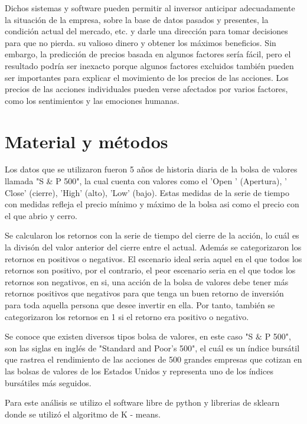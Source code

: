 \documentclass[a4paper]{article}
\begin{document}
Dichos sistemas y software pueden permitir al inversor anticipar adecuadamente la situación de la empresa, sobre la base de datos pasados y presentes, la condición actual del mercado, etc. y darle una dirección para tomar decisiones para que no pierda. su valioso dinero y obtener los máximos beneficios. Sin embargo, la predicción de precios basada en algunos factores sería fácil, pero el resultado podría ser inexacto porque algunos factores excluidos también pueden ser importantes para explicar el movimiento de los precios de las acciones. Los precios de las acciones individuales pueden verse afectados por varios factores, como los sentimientos y las emociones humanas. 

\section{Material y m\'etodos}
Los datos que se utilizaron fueron 5 a\~{n}os de historia diaria de la bolsa de valores llamada "S \& P 500", la cual cuenta con valores como el 'Open '  (Apertura), ' Close' (cierre), 'High' (alto), 'Low' (bajo). Estas medidas de la serie de tiempo con medidas  refleja el precio m\'inimo y m\'aximo de la bolsa asi como el precio con el que abrio y cerro. 

Se calcularon los retornos con la serie de tiempo del cierre de la acción, lo cu\'al es la divisón del valor anterior del cierre entre el actual. Además se categorizaron los retornos en positivos o negativos. El escenario ideal seria aquel en el que todos los retornos son positivo, por el contrario, el peor escenario seria en el que todos los retornos son negativos, en si, una acción de la bolsa de valores debe tener más retornos positivos que negativos para que tenga un buen retorno de inversión para toda aquella persona que desee invertir en ella. Por tanto, también se categorizaron los retornos en 1 si el retorno era positivo o negativo. 

Se conoce que existen diversos tipos bolsa de valores, en este caso "S $\&$ P 500", son las siglas en ingl\'es de "Standard and Poor's 500", el cu\'al es un \'indice burs\'atil que rastrea el rendimiento de las acciones de 500 grandes empresas que cotizan en las bolsas de valores de los Estados Unidos y representa uno de los \'indices burs\'atiles m\'as seguidos.

Para este an\'alisis se utilizo el software libre de python y librerias de sklearn donde se utiliz\'o el algoritmo de K - means.
\end{document}
